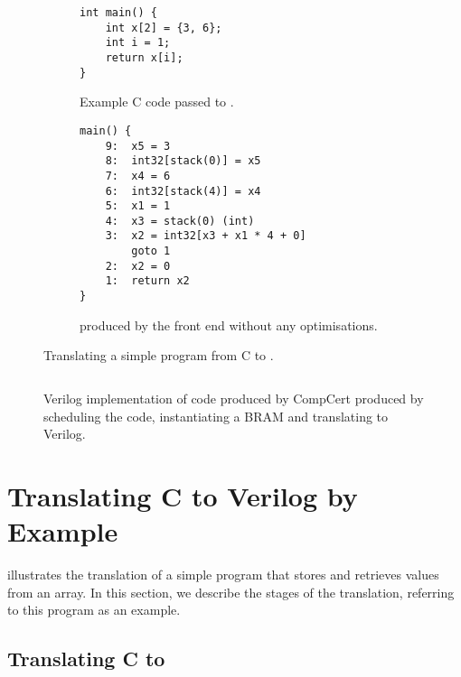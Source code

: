 \begin{figure}
  \centering
    \begin{subfigure}[b]{0.48\linewidth}
\begin{verbatim}
int main() {
    int x[2] = {3, 6};
    int i = 1;
    return x[i];
}
\end{verbatim}
      \caption{Example C code passed to \vericert{}.}\label{fig:accumulator_c}
    \end{subfigure}\hfill%
    \begin{subfigure}[b]{0.48\linewidth}
\begin{verbatim}
main() {
    9:  x5 = 3
    8:  int32[stack(0)] = x5
    7:  x4 = 6
    6:  int32[stack(4)] = x4
    5:  x1 = 1
    4:  x3 = stack(0) (int)
    3:  x2 = int32[x3 + x1 * 4 + 0]
        goto 1
    2:  x2 = 0
    1:  return x2
}
\end{verbatim}
      \caption{\rtl{} produced by the \compcert{} front end without any optimisations.}\label{fig:accumulator_rtl}
    \end{subfigure}
    \caption{Translating a simple program from C to \rtl{}.}\label{fig:accumulator_c_rtl}
\end{figure}

\begin{figure}
  \centering
  \inputminted[fontsize=\footnotesize,linenos,xleftmargin=20pt]{systemverilog}{figures/3-introduction-to-vericert/translated-verilog.sv}
  \caption{Verilog implementation of \rtl{} code produced by CompCert produced
    by scheduling the code, instantiating a BRAM and translating to Verilog.}
  \label{fig:accumulator_v}
\end{figure}

\section{Translating C to Verilog by Example}%
\label{sec:itv:translating-c-to-verilog}

 illustrates the translation of a simple program
that stores and retrieves values from an array.  In this section, we describe
the stages of the \vericert{} translation, referring to this program as an
example.

\subsection{Translating C to \rtl{}}

